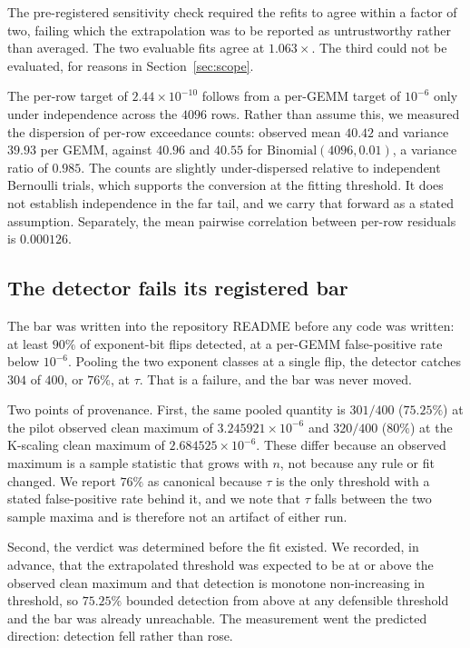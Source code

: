 \documentclass[11pt]{article}
\begin{document}
The pre-registered sensitivity check required the refits to agree within a
factor of two, failing which the extrapolation was to be reported as
untrustworthy rather than averaged. The two evaluable fits agree at
$1.063\times$. The third could not be evaluated, for reasons in
Section~\ref{sec:scope}.

The per-row target of $2.44 \times 10^{-10}$ follows from a per-GEMM target of
$10^{-6}$ only under independence across the $4096$ rows. Rather than assume
this, we measured the dispersion of per-row exceedance counts: observed mean
$40.42$ and variance $39.93$ per GEMM, against $40.96$ and $40.55$ for
$\mathrm{Binomial}(4096, 0.01)$, a variance ratio of $0.985$. The counts are
slightly under-dispersed relative to independent Bernoulli trials, which
supports the conversion at the fitting threshold. It does not establish
independence in the far tail, and we carry that forward as a stated assumption.
Separately, the mean pairwise correlation between per-row residuals is
$0.000126$.

\subsection{The detector fails its registered bar}
\label{sec:results:kt1}

The bar was written into the repository README before any code was written:
at least $90\%$ of exponent-bit flips detected, at a per-GEMM false-positive
rate below $10^{-6}$. Pooling the two exponent classes at a single flip, the
detector catches $304$ of $400$, or $76\%$, at $\tau$. That is a failure, and
the bar was never moved.

Two points of provenance. First, the same pooled quantity is $301/400$
($75.25\%$) at the pilot observed clean maximum of
$3.245921 \times 10^{-6}$ and $320/400$ ($80\%$) at the K-scaling clean maximum
of $2.684525 \times 10^{-6}$. These differ because an observed maximum is a
sample statistic that grows with $n$, not because any rule or fit changed. We
report $76\%$ as canonical because $\tau$ is the only threshold with a stated
false-positive rate behind it, and we note that $\tau$ falls between the two
sample maxima and is therefore not an artifact of either run.

Second, the verdict was determined before the fit existed. We recorded, in
advance, that the extrapolated threshold was expected to be at or above the
observed clean maximum and that detection is monotone non-increasing in
threshold, so $75.25\%$ bounded detection from above at any defensible
threshold and the bar was already unreachable. The measurement went the
predicted direction: detection fell rather than rose.
\end{document}
